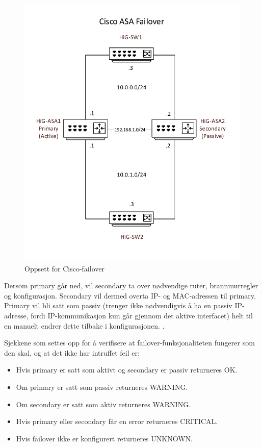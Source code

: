 \begin{figure}[H]
    \centering
    \includegraphics[scale=0.6]{img/asafailover}
    \caption{Oppsett for Cisco-failover}
    \label{ciscoasafailover}
\end{figure}

Dersom primary går ned, vil secondary ta over nødvendige ruter, brannmurregler og konfigurasjon. Secondary vil dermed overta IP- og MAC-adressen til primary. Primary vil bli satt som passiv (trenger ikke nødvendigvis å ha en passiv IP-adresse, fordi IP-kommunikasjon kun går gjennom det aktive interfacet) helt til en manuelt endrer dette tilbake i konfigurasjonen. \cite{ciscofailover}. 

Sjekkene som settes opp for å verifisere at failover-funksjonaliteten fungerer som den skal, og at det ikke har intruffet feil er:
\begin{itemize}
\item Hvis primary er satt som aktivt og secondary er passiv returneres OK.
\item Om primary er satt som passiv returneres WARNING. 
\item Om secondary er satt som aktiv returneres WARNING.
\item Hvis primary eller secondary får en error returneres CRITICAL.
\item Hvis failover ikke er konfigurert returneres UNKNOWN. 
\end{itemize}

